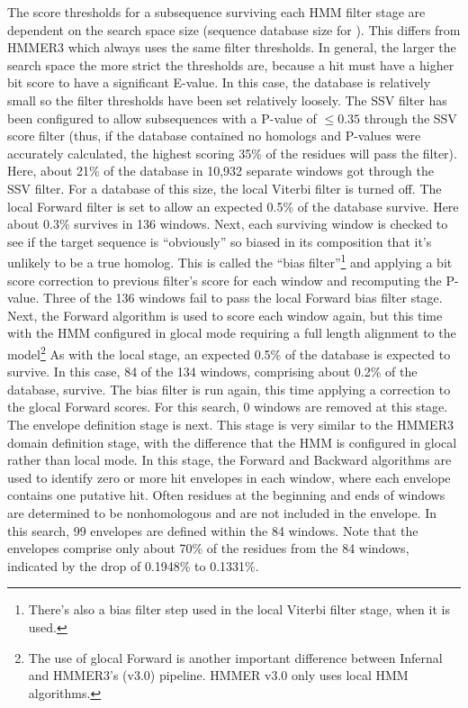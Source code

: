 The score thresholds for a subsequence surviving each HMM filter stage
are dependent on the search space size (sequence database size for
). This differs from HMMER3 which always uses the same
filter thresholds. In general, the larger the search
space the more strict the thresholds are, because a hit must have a
higher bit score to have a significant E-value.  In this case, the
database is relatively small so the filter thresholds have been set
relatively loosely. The SSV filter has been configured to allow
subsequences with a P-value of $\leq 0.35$ through
the SSV score filter (thus, if the database contained no homologs and
P-values were accurately calculated, the highest scoring 35\% of the
residues will pass the filter). Here, about 21\% of the database in
10,932 separate windows got through the SSV filter. For a database of
this size, the local Viterbi filter is turned off.  The local Forward filter
is set to allow an expected 0.5\% of the database survive. Here about
0.3\% survives in 136 windows. Next, each surviving window is checked
to see if the target sequence is ``obviously'' so biased in its
composition that it's unlikely to be a true homolog. This is called
the ``bias filter''\footnote{There's also a bias filter step used in
  the local Viterbi filter stage, when it is used.} and applying a bit
score correction to previous filter's score for each window and
recomputing the P-value. Three of the 136 windows fail to pass
the local Forward bias filter stage. Next, the Forward algorithm is
used to score each window again, but this time with the HMM configured
in glocal mode requiring a full length alignment to the
model\footnote{The use of glocal Forward is another important
  difference between Infernal and HMMER3's (v3.0) pipeline. HMMER v3.0
  only uses local HMM algorithms.}  As with the local stage, an
expected 0.5\% of the database is expected to survive. In this case,
84 of the 134 windows, comprising about 0.2\% of the database,
survive. The bias filter is run again, this time applying a correction
to the glocal Forward scores. For this search, 0 windows are removed at
this stage. The envelope definition stage is next. This stage is very
similar to the HMMER3 domain definition stage, with the difference
that the HMM is configured in glocal rather than local mode. In this
stage, the Forward and Backward algorithms are used to identify zero
or more hit envelopes in each window, where each envelope contains one
putative hit.  Often residues at the beginning and ends of windows are
determined to be nonhomologous and are not included in the
envelope. In this search,  99 envelopes are defined within the 84
windows. Note that the envelopes comprise only about 70\% of the
residues from the 84 windows, indicated by the drop of 0.1948\% to
0.1331\%.


